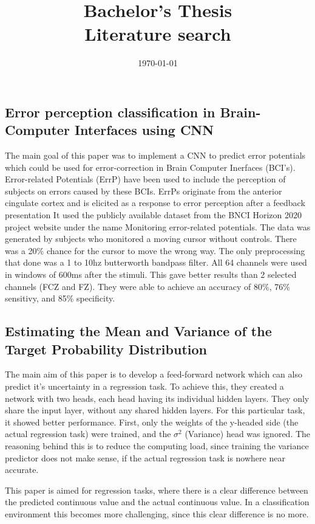 \documentclass[10pt]{article}
\title{{\bf Bachelor's Thesis} \\ Literature search}
\author{}
\date{\today}
\begin{document}
\maketitle

\subsection*{Error perception classification in Brain-Computer Interfaces using CNN \cite{correia2021error}}

The main goal of this paper was to implement a CNN to predict error potentials which could be used for error-correction in Brain Computer Inerfaces (BCI's).
Error-related Potentials (ErrP) have been used to include the perception of subjects on errors caused by these BCIs.
ErrPs originate from the anterior cingulate cortex and is elicited as a response to error perception after a feedback presentation 
It used the publicly available dataset from the BNCI Horizon 2020 project website under the name Monitoring error-related potentials. The data was generated by subjects who monitored a moving cursor without controls. There was a 20\% chance for the cursor to move the wrong way. 
The only preprocessing that done was a 1 to 10hz butterworth bandpass filter.
All 64 channels were used in windows of 600ms after the stimuli. This gave better results than 2 selected channels (FCZ and FZ).
They were able to achieve an accuracy of 80\%, 76\% sensitivy, and 85\% specificity. 

\subsection*{Estimating the Mean and Variance of the Target Probability Distribution \cite{nix1994estimating}}
The main aim of this paper is to develop a feed-forward network which can also predict it's uncertainty in a regression task. 
To achieve this, they created a network with two heads, each head having its individual hidden layers. They only share the input layer, 
without any shared hidden layers. For this particular task, it showed better performance. First, only the weights of the y-headed side 
(the actual regression task) were trained, and the $\sigma^2$ (Variance) head was ignored. The reasoning behind this is to reduce the computing load, since training the variance predictor does not make sense, 
if the actual regression task is nowhere near accurate.

This paper is aimed for regression tasks, where there is a clear difference between the predicted continuous value and the actual continuous value. In a classification environment this becomes more challenging, since this clear difference is no more.
\end{document}
